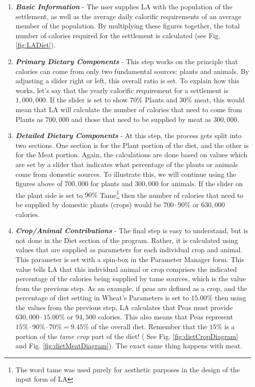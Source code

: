     \begin{enumerate}
      \item \textbf{\textit{Basic Information}} - The user supplies LA with the
      population of the settlement, as well as the average daily calorific
      requirements of an average member of the population.  By multiplying
      these figures together, the total number of calories required for the
      settlement is calculated (see Fig. \ref{fig:LADiet}).

      \item \textbf{\textit{Primary Dietary Components}} - This step works on
      the principle that calories can come from only two fundamental sources:
      plants and animals.  By adjusting a slider right or left, this overall
      ratio is set.  To explain how this works, let's say that the yearly
      calorific requirement for a settlement is $1,000,000$.  If the slider is
      set to show $70\%$ Plants and $30\%$ meat, this would mean that LA will
      calculate the number of calories that need to come from Plants as
      $700,000$ and those that need to be supplied by meat as $300,000$.

      \item \textbf{\textit{Detailed Dietary Components}} - At this step, the
      process gets split into two sections.  One section is for the Plant
      portion of the diet, and the other is for the Meat portion.  Again, the
      calculations are done based on values which are set by a slider that
      indicates what percentage of the plants or animals come from domestic
      sources.  To illustrate this, we will continue using the figures above of
      $700,000$ for plants and $300,000$ for animals.  If the slider on the
      plant side is set to $90\%$ Tame\footnote{The word tame was used purely
      for aesthetic purposes in the design of the input form of LA} then the
        number of calories that need to be supplied by domestic plants (crops)
        would be $700 \cdot 90\%$ or $630,000$ calories.  

      \item \textbf{\textit{Crop/Animal Contributions}} - The final step is
      easy to understand, but is not done in the Diet section of the program.
      Rather, it is calculated using values that are supplied as parameters for
      each individual crop and animal.  This parameter is set with a spin-box
      in the Parameter Manager form.  This value tells LA that this individual
      animal or crop comprises the indicated percentage of the calories being
      supplied by tame sources, which is the value from the previous step. As
      an example, if peas are defined as a crop, and the percentage of diet
      setting in Wheat's Parameters is set to $15.00\%$ then using the values
      from the previous step, LA calculates that Peas must provide $630,000
      \cdot 15.00\%$ or $94,500$ calories.  This also means that Peas represent
      $15\%\cdot90\%\cdot70\%=9.45\%$ of the overall diet.  Remember that the
      $15\%$ is a portion of the \textit{tame crop} part of the diet! ( See
      Fig. \ref{fig:dietCropDiagram} and Fig. \ref{fig:dietMeatDiagram}).  The
      exact same thing happens with meat.
    \end{enumerate}

